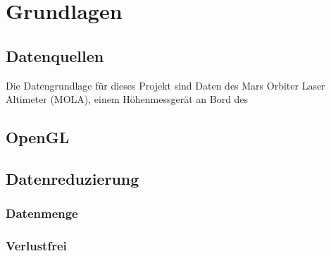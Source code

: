 \chapter{Grundlagen}

\section{Datenquellen}
Die Datengrundlage für dieses Projekt sind Daten des Mars Orbiter Laser Altimeter (MOLA), einem Höhenmessgerät an Bord des 
               




\section{OpenGL}

\section{Datenreduzierung}

\subsection{Datenmenge}\label{datenmenge}

\subsection{Verlustfrei}

